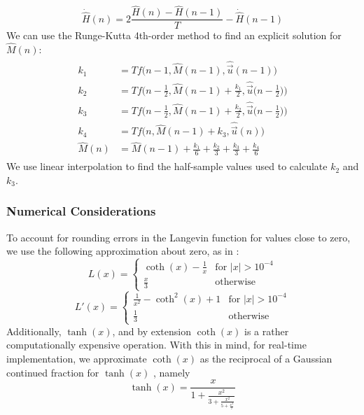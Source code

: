 \documentclass[twoside,a4paper]{article}
\begin{document}
\begin{equation}
    \dot{\hat{H}}(n) = 2\frac{\hat{H}(n) - \hat{H}(n-1)}{T} - \dot{\hat{H}}(n-1)
    \label{eq:hDeriv}
\end{equation}
%
We can use the Runge-Kutta 4th-order method \cite{Yeh} to find an explicit solution
for $\hat{M}(n)$:
\begin{align}
\begin{split}
    k_1 &= T f \Big(n-1, \hat{M}(n-1), \hat{\vec{u}}(n-1) \Big)\\
    k_2 &= T f \Big(n - \frac{1}{2}, \hat{M}(n-1) + \frac{k_1}{2}, \hat{\vec{u}}  \Big(n-\frac{1}{2} \Big) \Big)\\
    k_3 &= T f \Big(n- \frac{1}{2}, \hat{M}(n-1) + \frac{k_2}{2}, \hat{\vec{u}} \Big(n-\frac{1}{2} \Big) \Big)\\
    k_4 &= T f \Big(n, \hat{M}(n-1) + k_3, \hat{\vec{u}}(n) \Big)\\
    \hat{M}(n) &= \hat{M}(n-1) + \frac{k_1}{6} + \frac{k_2}{3} + \frac{k_3}{3} + \frac{k_4}{6}
    \label{eq:Mn}
\end{split}
\end{align}
%
We use linear interpolation to find the half-sample values used to calculate $k_2$ and $k_3$.

\subsubsection{Numerical Considerations} \label{numerical}
To account for rounding errors in the Langevin function for values close to 
zero, we use the following approximation about zero, as in \cite{Hysteresis}:
\begin{equation}
    L(x) = \begin{cases}
        \coth(x) - \frac{1}{x} & \text{for $|x| > 10^{-4}$} \\
        \frac{x}{3} & \text{otherwise}
    \end{cases}
\end{equation}
\begin{equation}
    L'(x) = \begin{cases}
        \frac{1}{x^2} - \coth^{2}(x) + 1 & \text{for $|x| > 10^{-4}$} \\
        \frac{1}{3} & \text{otherwise}
    \end{cases}
\end{equation}
%
Additionally, $\tanh(x)$, and by extension $\coth(x)$ is a
rather computationally expensive operation. With this in mind,
for real-time implementation, we approximate $\coth(x)$ as the
reciprocal of a Gaussian continued fraction for $\tanh(x)$
\cite{MATH}, namely
\begin{equation}
    \tanh(x) = \frac{x}{1 + \frac{x^2}{3 + \frac{x^2}{5 + \frac{x^2}{7}}}}
    \label{eq:continuedFrac}
\end{equation}
\end{document}
